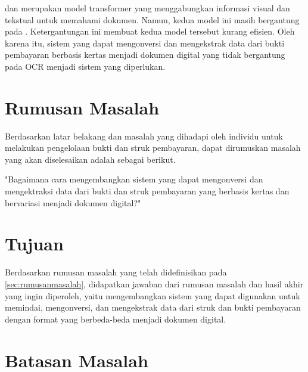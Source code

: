 \layoutlm{} dan \bert{} merupakan model transformer yang menggabungkan informasi visual dan tekstual untuk memahami dokumen. Namun, kedua model ini masih bergantung pada \ocr. Ketergantungan ini membuat kedua model tersebut kurang efisien. Oleh karena itu, sistem yang dapat mengonversi dan mengekstrak data dari bukti pembayaran berbasis kertas menjadi dokumen digital yang tidak bergantung pada OCR menjadi sistem yang diperlukan.

\section{Rumusan Masalah}
\label{sec:rumusanmasalah}

Berdasarkan latar belakang dan masalah yang dihadapi oleh individu untuk melakukan pengelolaan bukti dan struk pembayaran, dapat dirumuskan masalah yang akan diselesaikan adalah sebagai berikut.

\begin{center}
	"Bagaimana cara mengembangkan sistem yang dapat mengonversi dan mengektraksi data dari bukti dan struk pembayaran yang berbasis kertas dan bervariasi menjadi dokumen digital?"
\end{center}

\section{Tujuan}
\label{sec:tujuan}

Berdasarkan rumusan masalah yang telah didefinisikan pada \autoref{sec:rumusanmasalah}, didapatkan jawaban dari rumusan masalah dan hasil akhir yang ingin diperoleh, yaitu mengembangkan sistem yang dapat digunakan untuk memindai, mengonversi, dan mengekstrak data dari struk dan bukti pembayaran dengan format yang berbeda-beda menjadi dokumen digital.

\section{Batasan Masalah}
\label{sec:batasanmasalah}

